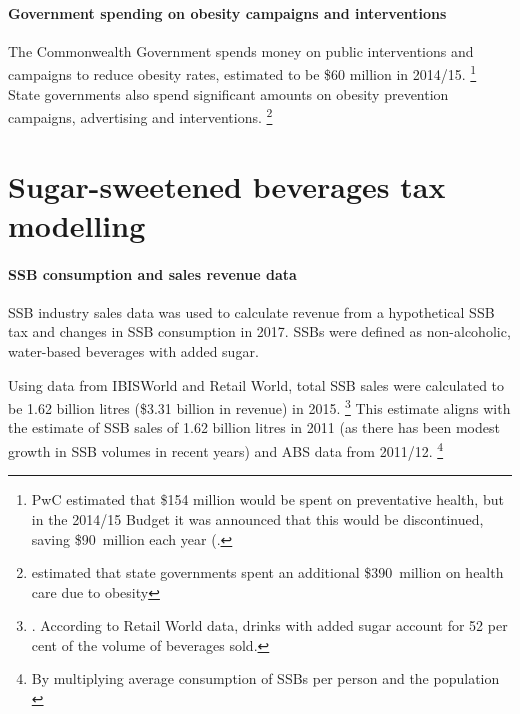 \documentclass[embargoed]{grattan}
\begin{document}
\subsubsection{Government spending on obesity campaigns and interventions}\label{government-spending-on-obesity-campaigns-and-interventions}

The Commonwealth Government spends money on public interventions and campaigns to reduce obesity rates, estimated to be \$60 million in 2014/15.%
\footnote{PwC estimated that \$154 million would be spent on preventative health, but in the 2014/15 Budget it was announced that this would be discontinued, saving \$90~million each year (\textcites{PwC2015Weighingcostobesity}{Treasury2016201617BudgetBudget}.} State governments also spend significant amounts on obesity prevention campaigns, advertising and interventions.%
\footnote{\textcite{PwC2015Weighingcostobesity} estimated that state governments spent an additional \$390~million on health care due to obesity}

\chapter{Sugar-sweetened beverages tax modelling}\label{appendix-3-modelling-sugar-sweetened-beverages-tax-options}

\subsubsection{SSB consumption and sales revenue data}\label{ssb-consumption-and-sales-revenue-data}

SSB industry sales data was used to calculate revenue from a hypothetical SSB tax and changes in SSB consumption in 2017.
SSBs were defined as non-alcoholic, water-based beverages with added sugar.

Using data from IBISWorld and Retail World, total SSB sales were calculated to be 1.62 billion litres (\$3.31 billion in revenue) in 2015.%
\footnote{\textcites{Media2015RetailWorldAnnual}{IBISWorld2016FruitJuiceDrink}{IBISWorld2016SoftDrinkManufacturing}.
According to Retail World data, drinks with added sugar account for 52 per cent of the volume of beverages sold.} 
This estimate aligns with the \textcite{Levy2014QuenchingAustraliasthirst} estimate of SSB sales of 1.62 billion litres in 2011 (as there has been modest growth in SSB volumes in recent years) and ABS data from 2011/12.%
\footnote{By multiplying average consumption of SSBs per person and the population \textcite{ABS20144364055007AustralianHealth}}
\end{document}
